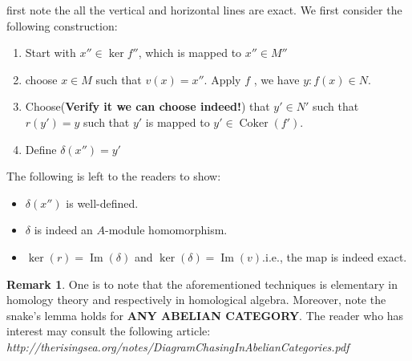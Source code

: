 \documentclass[12pt]{article}
\theoremstyle{definition}
\newtheorem*{noRmk}{Remark}
\theoremstyle{plain}
\DeclareMathOperator{\im}{Im}
\DeclareMathOperator{\Coker}{Coker}
\begin{document}
\proof first note the all the vertical and horizontal lines are exact. We first consider the following construction:
\begin{enumerate}
  \item Start with $x''\in \ker f''$, which is mapped to $x''\in M''$
  \item choose $x\in M$ such that $v(x)=x''$. Apply $f$ , we have $y:f(x)\in N$.
  \item Choose(\textbf{Verify it we can choose indeed!}) that $y'\in N'$ such that $r(y')=y$ such that $y'$ is mapped to $y'\in \Coker(f')$.
  \item Define $\delta(x'')=y'$
\end{enumerate}
The following is left to the readers to show:
\begin{itemize}
  \item $\delta(x'')$ is well-defined.
  \item $\delta$ is indeed an $A$-module homomorphism.
  \item $\ker(r)=\im(\delta)$ and $\ker(\delta)=\im(v)$.i.e., the map is indeed exact.
\end{itemize}
\begin{noRmk}
One is to note that the aforementioned techniques is elementary in homology theory and respectively in homological algebra. Moreover, note the snake's lemma holds for \textbf{ANY ABELIAN CATEGORY}. The reader who has interest may consult the following article:\\
\textit{http://therisingsea.org/notes/DiagramChasingInAbelianCategories.pdf}
\end{noRmk}
\end{document}
